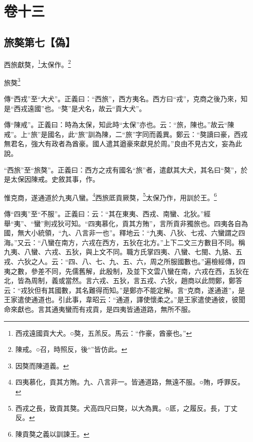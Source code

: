 

\chapter{卷十三}


\section{旅獒第七【偽】}


西旅獻獒，\footnote{西戎遠國貢大犬。○獒，五羔反。馬云：“作豪，酋豪也。”}太保作。\footnote{陳戒。○召，時照反，後“”皆仿此。}

旅獒\footnote{因獒而陳道義。}


{\noindent\zhuan{}\fzbyks 傳“西戎”至“大犬”。正義曰：“西旅”，西方夷名。西方曰“戎”，克商之後乃來，知是“西戎遠國”也。“獒”是犬名，故云“貢大犬”。 \par}

{\noindent\zhuan{}\fzbyks 傳“陳戒”。正義曰：時為太保，知此時“太保”亦也。云：“旅，陳也。”故云“陳戒”。上“旅”是國名，此“旅”訓為陳，二“旅”字同而義異。鄭云：“獒讀曰豪，西戎無君名，強大有政者為酋豪。國人遣其遒豪來獻見於周。”良由不見古文，妄為此說。 \par}

{\noindent\shu{}\fzkt “西旅”至“旅獒”。正義曰：西方之戎有國名“旅”者，遣獻其大犬，其名曰“獒”，於是太保因陳戒。史敘其事，作。 \par}

惟克商，遂通道於九夷八蠻。\footnote{四夷慕化，貢其方賄。九、八言非一。皆通道路，無遠不服。○賄，呼罪反。}西旅厎貢厥獒，\footnote{西戎之長，致貢其獒。犬高四尺曰獒，以大為異。○厎，之履反。長，丁丈反。}太保乃作，用訓於王。\footnote{陳貢獒之義以訓諫王。}


{\noindent\zhuan{}\fzbyks 傳“四夷”至“不服”。正義曰：云：“其在東夷、西戎、南蠻、北狄。”經舉“夷”、“蠻”則戎狄可知。“四夷慕化，貢其方賄”，言所貢非獨旅也。四夷各自為國，無大小統領，“九、八言非一也”。釋地云：“九夷、八狄、七戎、六蠻謂之四海。”又云：“八蠻在南方，六戎在西方，五狄在北方。”上下二文三方數目不同。稱九夷、八蠻、六戎、五狄，與上文不同。職方氏掌四夷、八蠻、七閩、九貉、五戎、六狄之人。云：“四、八、七、九、五、六，周之所服國數也。”遍檢經傳，四夷之數，參差不同，先儒舊解，此殷制，及並下文雲八蠻在南，六戎在西，五狄在北，皆為周制，義或當然。言六戎、五狄，言五戎、六狄，趙商以此問鄭，鄭答云：“戎狄但有其國數，其名難得而知。”是鄭亦不能定解。言“克商，遂通道”，是王家遣使通道也。引此事，韋昭云：“通道，譯使懷柔之。”是王家遣使通彼，彼聞命來獻也。言其通夷蠻而有戎貢，是四夷皆通道路，無所不服。 \par}

